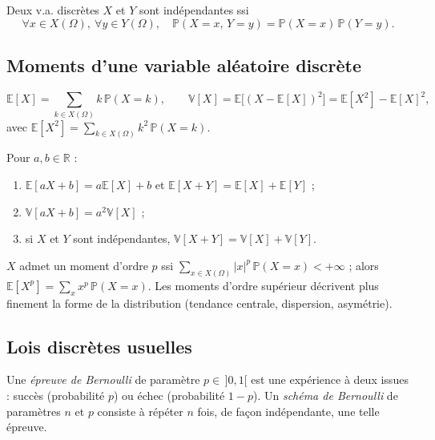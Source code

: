 \documentclass[11pt,a4paper]{article}
\newcommand{\E}{\mathbb{E}}
\newcommand{\V}{\mathbb{V}}
\renewcommand{\P}{\mathbb{P}}
\newcommand{\R}{\mathbb{R}}
\newcommand{\1}{\mathbf{1}}
\begin{document}
\begin{proposition}[Indépendance]
Deux v.a. discrètes $X$ et $Y$ sont indépendantes ssi
\[
\forall x\in X(\Omega),\ \forall y\in Y(\Omega),\quad \P(X=x,\,Y=y)=\P(X=x)\,\P(Y=y).
\]
\end{proposition}

\subsection{Moments d'une variable aléatoire discrète}

\begin{definition}
\[
\E[X]=\sum_{k\in X(\Omega)}k\,\P(X=k),\qquad
\V[X]=\E\big[(X-\E[X])^2\big]=\E[X^2]-\E[X]^2,
\]
avec $\E[X^2]=\sum_{k\in X(\Omega)}k^2\,\P(X=k)$.
\end{definition}

\begin{proposition}[Propriétés]
Pour $a,b\in\R$ :
\begin{enumerate}
  \item $\E[aX+b]=a\E[X]+b$ et $\E[X+Y]=\E[X]+\E[Y]$ ;
  \item $\V[aX+b]=a^2\V[X]$ ;
  \item si $X$ et $Y$ sont indépendantes, $\V[X+Y]=\V[X]+\V[Y]$.
\end{enumerate}
\end{proposition}

\begin{definition}
$X$ admet un moment d'ordre $p$ ssi $\sum_{x\in X(\Omega)}|x|^p\,\P(X=x)<+\infty$ ; alors $\E[X^p]=\sum_{x}x^p\,\P(X=x)$.
Les moments d'ordre supérieur décrivent plus finement la forme de la distribution (tendance centrale, dispersion, asymétrie).
\end{definition}

\subsection{Lois discrètes usuelles}

\begin{definition}
Une \emph{épreuve de Bernoulli} de paramètre $p\in\,]0,1[$ est une expérience à deux issues : succès (probabilité $p$) ou échec (probabilité $1-p$). Un \emph{schéma de Bernoulli} de paramètres $n$ et $p$ consiste à répéter $n$ fois, de façon indépendante, une telle épreuve.
\end{definition}
\end{document}
